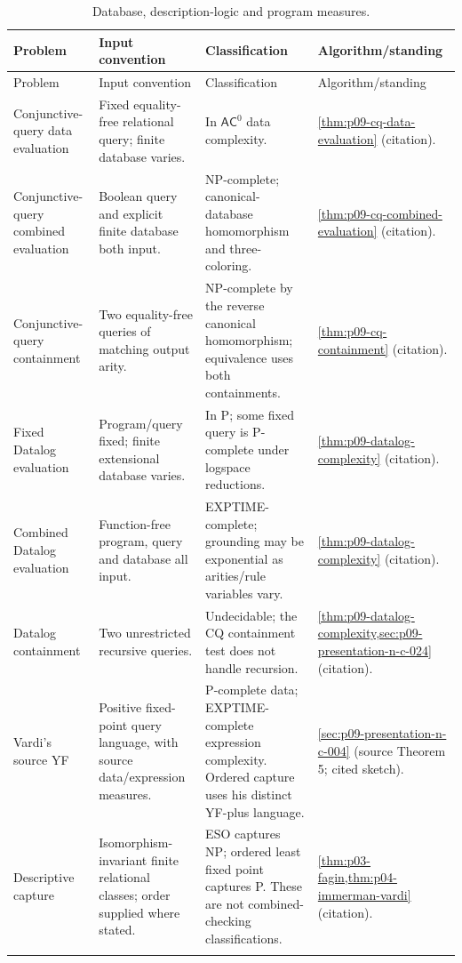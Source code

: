 \begin{landscape}
\begingroup\small\setlength{\tabcolsep}{3pt}
\begin{longtable}{@{}p{.18\linewidth}p{.25\linewidth}p{.23\linewidth}p{.26\linewidth}@{}}
\caption{Database, description-logic and program measures.}\label{tab:p14-dc-data}\\
\toprule
Problem & Input convention & Classification & Algorithm/standing\\\midrule
\endfirsthead
\toprule
Problem & Input convention & Classification & Algorithm/standing\\\midrule
\endhead
\bottomrule\endfoot
Conjunctive-query data evaluation & Fixed equality-free relational query; finite database varies. & In \(\mathsf{AC}^{0}\) data complexity. & \cref{thm:p09-cq-data-evaluation} (citation).\\\addlinespace
Conjunctive-query combined evaluation & Boolean query and explicit finite database both input. & NP-complete; canonical-database homomorphism and three-coloring. & \cref{thm:p09-cq-combined-evaluation} (citation).\\\addlinespace
Conjunctive-query containment & Two equality-free queries of matching output arity. & NP-complete by the reverse canonical homomorphism; equivalence uses both containments. & \cref{thm:p09-cq-containment} (citation).\\\addlinespace
Fixed Datalog evaluation & Program/query fixed; finite extensional database varies. & In P; some fixed query is P-complete under logspace reductions. & \cref{thm:p09-datalog-complexity} (citation).\\\addlinespace
Combined Datalog evaluation & Function-free program, query and database all input. & EXPTIME-complete; grounding may be exponential as arities/rule variables vary. & \cref{thm:p09-datalog-complexity} (citation).\\\addlinespace
Datalog containment & Two unrestricted recursive queries. & Undecidable; the CQ containment test does not handle recursion. & \cref{thm:p09-datalog-complexity,sec:p09-presentation-n-c-024} (citation).\\\addlinespace
Vardi's source YF & Positive fixed-point query language, with source data/expression measures. & P-complete data; EXPTIME-complete expression complexity. Ordered capture uses his distinct YF-plus language. & \cref{sec:p09-presentation-n-c-004} (source Theorem 5; cited sketch).\\\addlinespace
Descriptive capture & Isomorphism-invariant finite relational classes; order supplied where stated. & ESO captures NP; ordered least fixed point captures P. These are not combined-checking classifications. & \cref{thm:p03-fagin,thm:p04-immerman-vardi} (citation).\\\addlinespace

\end{longtable}
\end{landscape}
